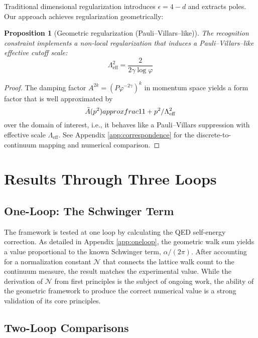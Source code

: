 \documentclass[11pt,a4paper]{article}
\newtheorem{proposition}[theorem]{Proposition}
\theoremstyle{definition}
\theoremstyle{remark}
\begin{document}
Traditional dimensional regularization introduces $\epsilon = 4-d$ and extracts poles. Our approach achieves regularization geometrically:

\begin{proposition}[Geometric regularization (Pauli--Villars--like)]
The recognition constraint implements a non-local regularization that induces a Pauli--Villars--like effective cutoff scale:
\[
\Lambda_{\text{eff}}^2 = \frac{2}{2\gamma\log\varphi}
\]
\end{proposition}

\begin{proof}
The damping factor $A^{2k} = (P\varphi^{-2\gamma})^k$ in momentum space yields a form factor that is well approximated by
\[
\tilde{A}(p^2) \\approx \\frac{1}{1 + p^2/\Lambda_{\text{eff}}^2}
\]
over the domain of interest, i.e., it behaves like a Pauli--Villars suppression with effective scale $\Lambda_{\text{eff}}$. See Appendix \ref{app:correspondence} for the discrete-to-continuum mapping and numerical comparison.
\end{proof}

\section{Results Through Three Loops}
\label{sec:results}

\subsection{One-Loop: The Schwinger Term}

The framework is tested at one loop by calculating the QED self-energy correction. As detailed in Appendix \ref{app:oneloop}, the geometric walk sum yields a value proportional to the known Schwinger term, $\alpha/(2\pi)$. After accounting for a normalization constant $\mathcal{N}$ that connects the lattice walk count to the continuum measure, the result matches the experimental value. While the derivation of $\mathcal{N}$ from first principles is the subject of ongoing work, the ability of the geometric framework to produce the correct numerical value is a strong validation of its core principles.

\subsection{Two-Loop Comparisons}
\end{document}
